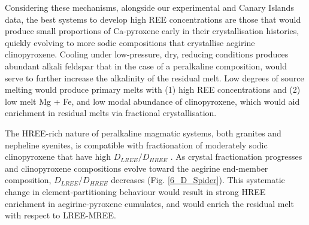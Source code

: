 \documentclass[final,authoryear,3p,times,twocolumn]{elsarticle}
\begin{document}
Considering these mechanisms, alongside our experimental and Canary Islands data, the best systems to develop high REE concentrations are those that would produce small proportions of Ca-pyroxene early in their crystallisation histories, quickly evolving to more sodic compositions that crystallise aegirine clinopyroxene. Cooling under low-pressure, dry, reducing conditions produces abundant alkali feldspar that in the case of a peralkaline composition, would serve to further increase the alkalinity of the residual melt.
	Low degrees of source melting would produce primary melts with (1) high REE concentrations and (2) low melt Mg + Fe, and low modal abundance of clinopyroxene, which would aid enrichment in residual melts via fractional crystallisation.



The HREE-rich nature of peralkaline magmatic systems, both granites and nepheline syenites, is compatible with fractionation of moderately sodic clinopyroxene that have high $D_{LREE}/D_{HREE}$ \citep[e.g.][]{Moller2016, Dostal2017}. As crystal fractionation progresses and clinopyroxene compositions evolve toward the aegirine end-member composition, $D_{LREE}/D_{HREE}$ decreases (Fig. \ref{6_D_Spider}). This systematic change in element-partitioning behaviour would result in strong HREE enrichment in aegirine-pyroxene cumulates, and would enrich the residual melt with respect to LREE-MREE.

\end{document}
